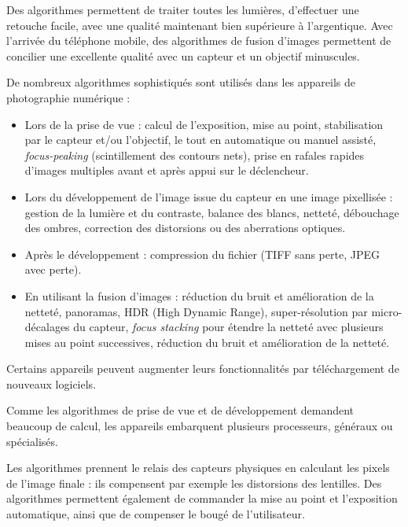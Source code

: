 \begin{tcolorbox}[title={Algorithmes et programmes}, toprule=0pt, leftrule=0pt, rightrule=0pt, arc=0pt,
                  fonttitle=\scshape\boxtitlefont,
                  colbacktitle=white, coltitle=firstcolor, colframe=firstcolor, colback=firstcolor!10,
                  breakable, enhanced jigsaw]
Des algorithmes permettent de traiter toutes les lumières, d’effectuer une retouche facile, avec une qualité maintenant bien supérieure à l’argentique. Avec l’arrivée du téléphone mobile, des algorithmes de fusion d’images permettent de concilier une excellente qualité avec un capteur et un objectif minuscules.

De nombreux algorithmes sophistiqués sont utilisés dans les appareils de photographie numérique :
\begin{itemize}
\item Lors  de la prise de vue : calcul de l’exposition, mise au point,  stabilisation par le capteur et/ou l’objectif, le tout en  automatique ou manuel assisté, \textit{focus-peaking} (scintillement  des contours nets), prise en rafales rapides d’images multiples  avant et après appui sur le déclencheur.
\item Lors  du développement de l’image issue du capteur en une image  pixellisée : gestion de la lumière et du contraste, balance  des blancs, netteté, débouchage des ombres, correction des distorsions ou des aberrations optiques.
\item Après  le développement : compression du fichier (TIFF sans perte,  JPEG avec perte).
\item En  utilisant la fusion d’images : réduction du bruit et  amélioration de la netteté, panoramas, HDR (High Dynamic Range), super-résolution par micro-décalages du capteur, \textit{focus stacking} pour étendre la netteté avec plusieurs mises au point  successives, réduction du bruit et amélioration de la netteté.
\end{itemize}

Certains appareils peuvent augmenter leurs fonctionnalités par téléchargement de nouveaux logiciels.
\end{tcolorbox}

\begin{tcolorbox}[title={Machines}, toprule=0pt, leftrule=0pt, rightrule=0pt, arc=0pt,
                  fonttitle=\scshape\boxtitlefont,
                  colbacktitle=white, coltitle=firstcolor, colframe=firstcolor, colback=firstcolor!10,
                  breakable, enhanced jigsaw]
Comme les algorithmes de prise de vue et de développement demandent beaucoup de calcul, les appareils embarquent plusieurs processeurs, généraux ou spécialisés.

Les algorithmes prennent le relais des capteurs physiques en calculant les pixels de l’image finale : ils compensent par exemple les distorsions des lentilles. Des algorithmes permettent également de commander la mise au point et l’exposition automatique, ainsi que de compenser le bougé de l’utilisateur. %
\end{tcolorbox}

